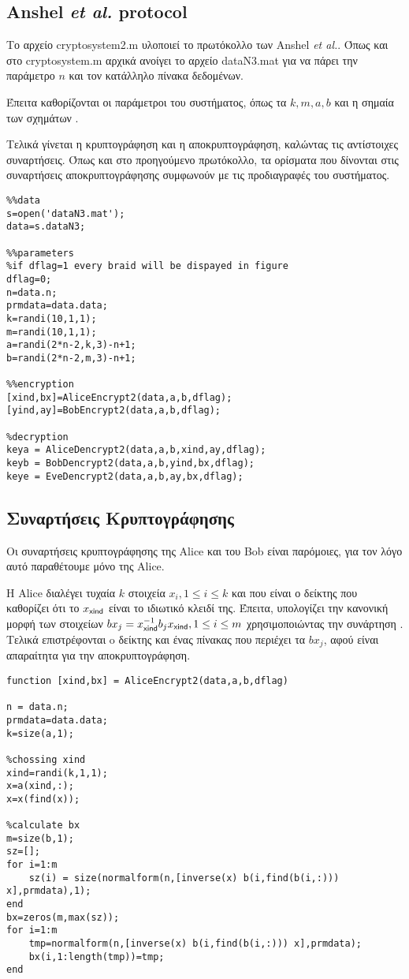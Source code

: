 \subsection{Anshel \textit{et al.} protocol}

Το αρχείο cryptosystem2.m υλοποιεί το πρωτόκολλο των Anshel \textit{et al.}. Όπως και στο cryptosystem.m αρχικά ανοίγει το αρχείο dataN3.mat για να πάρει την παράμετρο $ n $ και τον κατάλληλο πίνακα δεδομένων.

Έπειτα καθορίζονται οι παράμετροι του συστήματος, όπως τα $ k,m,a,b $ και η σημαία των σχημάτων .

Τελικά γίνεται η κρυπτογράφηση και η αποκρυπτογράφηση, καλώντας τις αντίστοιχες συναρτήσεις. Όπως και στο προηγούμενο πρωτόκολλο, τα ορίσματα που δίνονται στις συναρτήσεις αποκρυπτογράφησης συμφωνούν με τις προδιαγραφές του συστήματος.  
\begin{lstlisting}
%%data
s=open('dataN3.mat');
data=s.dataN3;

%%parameters
%if dflag=1 every braid will be dispayed in figure
dflag=0;
n=data.n;
prmdata=data.data;
k=randi(10,1,1);
m=randi(10,1,1);
a=randi(2*n-2,k,3)-n+1;
b=randi(2*n-2,m,3)-n+1;

%%encryption
[xind,bx]=AliceEncrypt2(data,a,b,dflag);
[yind,ay]=BobEncrypt2(data,a,b,dflag);

%decryption
keya = AliceDencrypt2(data,a,b,xind,ay,dflag);
keyb = BobDencrypt2(data,a,b,yind,bx,dflag);
keye = EveDencrypt2(data,a,b,ay,bx,dflag);
\end{lstlisting}

\subsection{Συναρτήσεις Κρυπτογράφησης}

Οι συναρτήσεις κρυπτογράφησης της Alice και του Bob είναι παρόμοιες, για τον λόγο αυτό παραθέτουμε μόνο της Alice.

Η Alice διαλέγει τυχαία $ k $ στοιχεία $ x_i, 1 \leq i \leq k $ και   που είναι ο δείκτης που καθορίζει ότι το $ x_{\mathsf{xind}} $ είναι το ιδιωτικό κλειδί της. Έπειτα, υπολογίζει την κανονική μορφή των στοιχείων $bx_j= x_{\mathsf{xind}}^{-1} b_j x_{\mathsf{xind}}, 1 \leq i \leq m $ χρησιμοποιώντας την συνάρτηση . Τελικά επιστρέφονται o δείκτης  και ένας πίνακας που περιέχει τα $ bx_j $, αφού είναι απαραίτητα για την αποκρυπτογράφηση.

\begin{lstlisting}
function [xind,bx] = AliceEncrypt2(data,a,b,dflag)

n = data.n;
prmdata=data.data;
k=size(a,1);

%chossing xind
xind=randi(k,1,1);
x=a(xind,:);
x=x(find(x));

%calculate bx
m=size(b,1);
sz=[];
for i=1:m
    sz(i) = size(normalform(n,[inverse(x) b(i,find(b(i,:))) x],prmdata),1);
end
bx=zeros(m,max(sz));
for i=1:m
    tmp=normalform(n,[inverse(x) b(i,find(b(i,:))) x],prmdata);
    bx(i,1:length(tmp))=tmp;
end
\end{lstlisting}  

